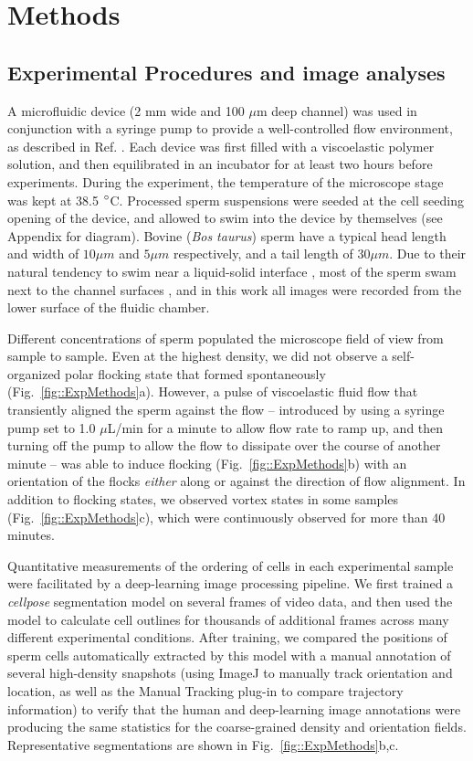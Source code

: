 \documentclass[reprint,unsortedaddress,amsmath,amssymb,aps,pre]{revtex4-2}
\begin{document}
\section{\label{Sec::Methods}Methods}

\subsection{Experimental Procedures and image analyses}
A microfluidic device (2 mm wide and 100 $\mu$m deep channel) was used in conjunction with a syringe pump to provide a well-controlled flow environment, as described in Ref. \cite{Tung2015emergence}. Each device was first filled with a viscoelastic polymer solution, and then equilibrated in an incubator for at least two hours before experiments. During the experiment, the temperature of the microscope stage was kept at 38.5 $\degree$C. Processed sperm suspensions were seeded at the cell seeding opening of the device, and allowed to swim into the device by themselves (see Appendix for diagram). Bovine (\textit{Bos taurus}) sperm have a typical head length and width of $10\mu{m}$ and $5\mu{m}$ respectively, and a tail length of $30\mu{m}$. Due to their natural tendency to swim near a liquid-solid interface \cite{Rothschild1963non, Drescher2011fluid}, most of the sperm swam next to the channel surfaces \cite{Nosrati2015two}, and in this work all images were recorded from the lower surface of the fluidic chamber.
    
Different concentrations of sperm populated the microscope field of view from sample to sample. Even at the highest density, we did not observe a self-organized polar flocking state that formed spontaneously (Fig.~\ref{fig::ExpMethods}a). However, a pulse of viscoelastic fluid flow that transiently aligned the sperm against the flow -- introduced by using a syringe pump set to 1.0 $\mu$L/min for a minute to allow flow rate to ramp up, and then turning off the pump to allow the flow to dissipate over the course of another minute -- was able to induce flocking (Fig.~\ref{fig::ExpMethods}b) with an orientation of the flocks \emph{either} along or against the direction of flow alignment. In addition to flocking states, we observed vortex states in some samples (Fig.~\ref{fig::ExpMethods}c), which were continuously observed for more than 40 minutes.

Quantitative measurements of the ordering of cells in each experimental sample were facilitated by a deep-learning image processing pipeline. We first trained a \textit{cellpose} segmentation model \cite{stringer2021cellpose} on several frames of video data, and then used the model to calculate cell outlines for thousands of additional frames across many different experimental conditions. After training, we compared the positions of sperm cells automatically extracted by this model with a manual annotation of several high-density snapshots (using ImageJ to manually track orientation and location, as well as the Manual Tracking plug-in to compare trajectory information) to verify that the human and deep-learning image annotations were producing the same statistics for the coarse-grained density and orientation fields. Representative segmentations are shown in Fig.~\ref{fig::ExpMethods}b,c. 
\end{document}
